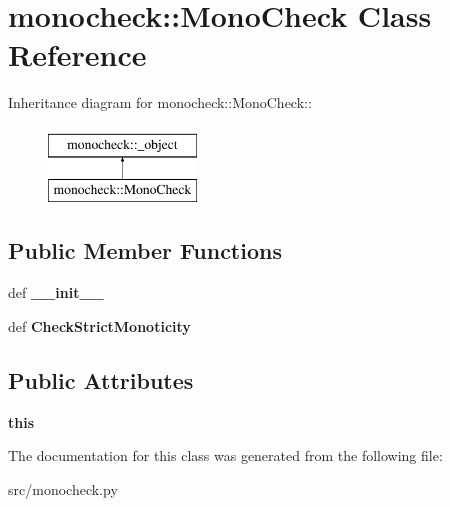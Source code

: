 \hypertarget{classmonocheck_1_1MonoCheck}{
\section{monocheck::MonoCheck Class Reference}
\label{d7/de1/classmonocheck_1_1MonoCheck}
}
Inheritance diagram for monocheck::MonoCheck::\begin{figure}[H]
\begin{center}
\leavevmode
\includegraphics[height=2cm]{d7/de1/classmonocheck_1_1MonoCheck}
\end{center}
\end{figure}
\subsection*{Public Member Functions}
\begin{DoxyCompactItemize}
\item 
\hypertarget{classmonocheck_1_1MonoCheck_a69a5e0b89b39ff0c0caac2604605dddd}{
def {\bfseries \_\-\_\-init\_\-\_\-}}
\label{d7/de1/classmonocheck_1_1MonoCheck_a69a5e0b89b39ff0c0caac2604605dddd}

\item 
\hypertarget{classmonocheck_1_1MonoCheck_a9684b1459e63268cf3a3962e79827355}{
def {\bfseries CheckStrictMonoticity}}
\label{d7/de1/classmonocheck_1_1MonoCheck_a9684b1459e63268cf3a3962e79827355}

\end{DoxyCompactItemize}
\subsection*{Public Attributes}
\begin{DoxyCompactItemize}
\item 
\hypertarget{classmonocheck_1_1MonoCheck_a4e896031c1c1933907b882f4c4807cae}{
{\bfseries this}}
\label{d7/de1/classmonocheck_1_1MonoCheck_a4e896031c1c1933907b882f4c4807cae}

\end{DoxyCompactItemize}


The documentation for this class was generated from the following file:\begin{DoxyCompactItemize}
\item 
src/monocheck.py\end{DoxyCompactItemize}
